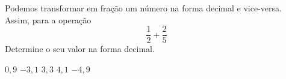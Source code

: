 Podemos transformar em fração um número na forma decimal e vice-versa. Assim, para a operação
\[ \frac{1}{2}+\frac{2}{5}\]
Determine o seu valor na forma decimal.

$ 0{,}9$
$-3{,}1$
$ 3{,}3$
$ 4{,}1$
$-4{,}9$



